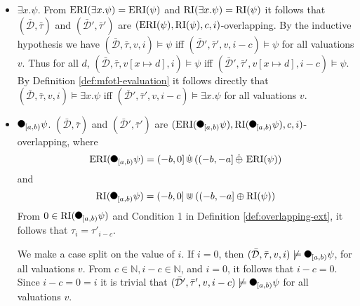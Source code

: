\begin{itemize}
    \item 
        $\exists x. \psi$.
        From $\operatorname{ERI}(\exists x. \psi) = \operatorname{ERI}(\psi)$ and $\operatorname{RI}(\exists x. \psi) = \operatorname{RI}(\psi)$ it follows that $(\bar{\mathcal{D}}, \bar{\tau})$ and $(\bar{\mathcal{D}}', \bar{\tau}')$ are $(\operatorname{ERI}(\psi), \operatorname{RI}(\psi), c, i)$-overlapping.
        By the inductive hypothesis we have $(\bar{\mathcal{D}}, \bar{\tau}, v, i) \models \psi$ iff $(\bar{\mathcal{D}}', \bar{\tau}', v, i-c) \models \psi$ for all valuations $v$.
        Thus for all $d$, $(\bar{\mathcal{D}}, \bar{\tau}, v[x \mapsto d], i) \models \psi$ iff $(\bar{\mathcal{D}}', \bar{\tau}', v[x \mapsto d], i-c) \models \psi$.
        By Definition \ref{def:mfotl-evaluation} it follows directly that $(\bar{\mathcal{D}}, \bar{\tau}, v, i) \models \exists x. \psi$ iff $(\bar{\mathcal{D}}', \bar{\tau}', v, i-c) \models \exists x. \psi$ for all valuations $v$.

    \item
        $\Previous{[a,b)} \psi$.
        $(\bar{\mathcal{D}}, \bar{\tau})$ and $(\bar{\mathcal{D}}', \bar{\tau}')$ are $(\ERI(\Previous{[a,b)} \psi), \RI(\Previous{[a,b)} \psi), c, i)$- overlapping, where
        \begin{equation*}
            \ERI(\Previous{[a,b)} \psi) = (-b,0] \Cupext ((-b,-a] \oplusext \ERI(\psi))
        \end{equation*}
        and
        \begin{equation*}
            \RI(\Previous{[a,b)} \psi) = (-b,0] \Cup ((-b,-a] \oplus \RI(\psi))
        \end{equation*}
        From $0 \in \RI(\Previous{[a,b)} \psi)$ and Condition 1 in Definition \ref{def:overlapping-ext}, it follows that $\tau_i = \tau'_{i-c}$.

        We make a case split on the value of $i$. If $i=0$, then $(\bar{\mathcal{D}}, \bar{\tau}, v, i) \not\models \Previous{[a,b)} \psi$, for all valuations $v$.
        From $c \in \mathbb{N}, i-c \in \mathbb{N}$, and $i=0$, it follows that $i-c=0$.
        Since $i-c = 0 = i$ it is trivial that $(\bar{\mathcal{D}}', \bar{\tau}', v, i-c) \not\models \Previous{[a,b)} \psi$ for all valuations $v$.


\end{itemize}
